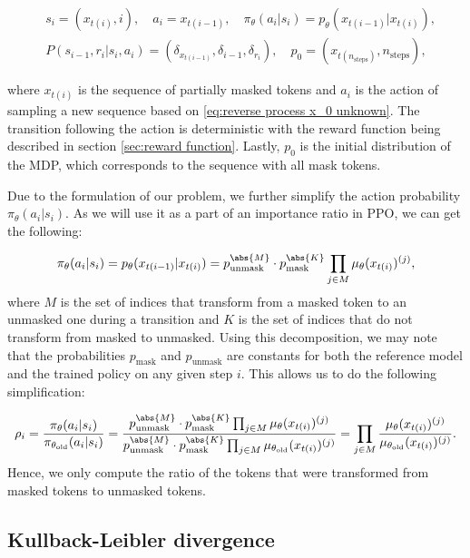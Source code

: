 \begin{align*}
    &s_i = (x_{t(i)}, i), \quad a_i = x_{t(i - 1)}, \quad \pi_\theta(a_i | s_i) = p_\theta(x_{t(i - 1)} | x_{t(i)}), \\
    &P(s_{i - 1}, r_i | s_i, a_i) = (\delta_{x_{t(i - 1)}}, \delta_{i - 1}, \delta_{r_i}), \quad p_0 = (x_{t(n_\mathrm{steps})}, n_\mathrm{steps}),
\end{align*}

where $x_{t(i)}$ is the sequence of partially masked tokens and $a_i$ is the action of sampling a new sequence based on \eqref{eq:reverse process x_0 unknown}. The transition following the action is deterministic with the reward function being described in section \ref{sec:reward function}. Lastly, $p_0$ is the initial distribution of the MDP, which corresponds to the sequence with all mask tokens.

Due to the formulation of our problem, we further simplify the action probability $\pi_\theta(a_i | s_i)$. As we will use it as a part of an importance ratio in PPO, we can get the following:

\begin{align*}
    \pi_\theta(a_i | s_i) = p_\theta(x_{t(i - 1)} | x_{t(i)}) = p_\mathrm{unmask}^{\abs{M}}\cdot p_\mathrm{mask} ^ {\abs{K}}\prod_{j\in M} \mu_\theta(x_{t(i)})^{(j)},
\end{align*}
where $M$ is the set of indices that transform from a masked token to an unmasked one during a transition and $K$ is the set of indices that do not transform from masked to unmasked. Using this decomposition, we may note that the probabilities $p_\mathrm{mask}$ and $p_\mathrm{unmask}$ are constants for both the reference model and the trained policy on any given step $i$. This allows us to do the following simplification:

\begin{equation*}
    \rho_i = \frac{\pi_\theta(a_i | s_i)}{\pi_{\theta_\text{old}}(a_i | s_i)} = \frac{p_\mathrm{unmask}^{\abs{M}}\cdot p_\mathrm{mask} ^ {\abs{K}}\prod_{j\in M} \mu_\theta(x_{t(i)})^{(j)}}{p_\mathrm{unmask}^{\abs{M}}\cdot p_\mathrm{mask} ^ {\abs{K}}\prod_{j\in M} \mu_{\theta_\text{old}}(x_{t(i)})^{(j)}} = \prod_{j\in M} \frac{\mu_\theta(x_{t(i)})^{(j)}}{\mu_{\theta_\text{old}}(x_{t(i)})^{(j)}}.
\end{equation*}
Hence, we only compute the ratio of the tokens that were transformed from masked tokens to unmasked tokens.


\subsection{Kullback-Leibler divergence}

